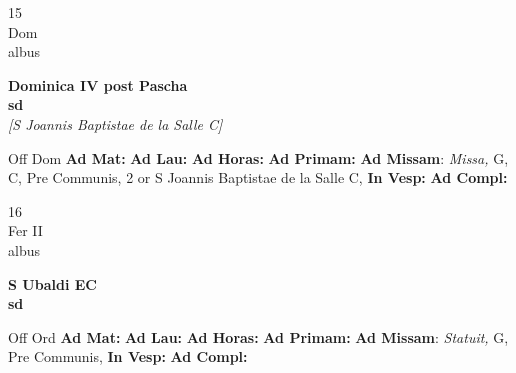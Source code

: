 \documentclass[10pt, openany]{book}
\begin{document}
        \begin{center}
            \begin{minipage}{3.5in}
                \vspace{2em}
                \begin{minipage}{0.5in}
                    {\Huge 15} \\
                    {\normalsize Dom} \\
                    {\normalsize albus}
                \end{minipage}
                \begin{minipage}{3.0in}
                    \textbf{ \large Dominica IV post Pascha \\
                    \textnormal{\normalsize sd}} \\ \textit{[S Joannis Baptistae de la Salle C]} \\ 
                \end{minipage}
                \begin{justify}Off Dom
                    \textbf{Ad Mat: }
                    \textbf{Ad Lau: }
                    \textbf{Ad Horas: }
                    \textbf{Ad Primam: }\textbf{Ad Missam}: \textit{Missa,} G, C, Pre Communis, 2 or S Joannis Baptistae de la Salle C,  
                    \textbf{In Vesp: }
                    \textbf{Ad Compl: }
                \end{justify}
            \end{minipage}
        \end{center}
    
        \begin{center}
            \begin{minipage}{3.5in}
                \vspace{2em}
                \begin{minipage}{0.5in}
                    {\Huge 16} \\
                    {\normalsize Fer II} \\
                    {\normalsize albus}
                \end{minipage}
                \begin{minipage}{3.0in}
                    \textbf{ \large S Ubaldi EC \\
                    \textnormal{\normalsize sd}} \\ 
                \end{minipage}
                \begin{justify}Off Ord
                    \textbf{Ad Mat: }
                    \textbf{Ad Lau: }
                    \textbf{Ad Horas: }
                    \textbf{Ad Primam: }\textbf{Ad Missam}: \textit{Statuit,} G, Pre Communis,  
                    \textbf{In Vesp: }
                    \textbf{Ad Compl: }
                \end{justify}
            \end{minipage}
        \end{center}
    
\end{document}

